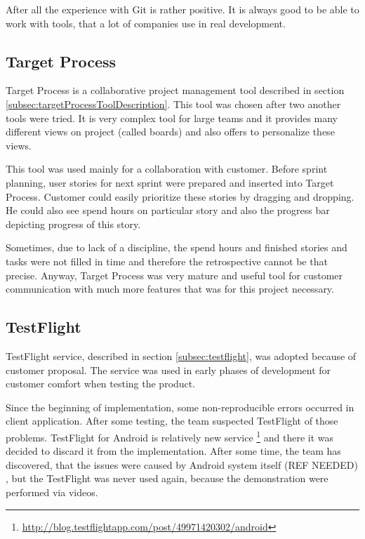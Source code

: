 After all the experience with Git is rather positive. 
It is always good to be able to work with tools, that a lot of companies use in real development.


\subsection{Target Process}
Target Process is a collaborative project management tool described in section \ref{subsec:targetProcessToolDescription}.
This tool was chosen after two another tools were tried.
It is very complex tool for large teams and it provides many different views on project (called boards) and also offers to personalize these views.

This tool was used mainly for a collaboration with customer. 
Before sprint planning, user stories for next sprint were prepared and inserted into Target Process.
Customer could easily prioritize these stories by dragging and dropping.
He could also see spend hours on particular story and also the progress bar depicting progress of this story.

Sometimes, due to lack of a discipline, the spend hours and finished stories and tasks were not filled in time and therefore the retrospective cannot be that precise.
Anyway, Target Process was very mature and useful tool for customer communication with much more features that was for this project necessary.


\subsection{TestFlight}
TestFlight service, described in section \ref{subsec:testflight}, was adopted because of customer proposal.
The service was used in early phases of development for customer comfort when testing the product.

Since the beginning of implementation, some non-reproducible errors occurred in client application.
After some testing, the team suspected TestFlight of those problems.
TestFlight for Android is relatively new service \footnote{\url{http://blog.testflightapp.com/post/49971420302/android}} and there it was decided to discard it from the implementation.
After some time, the team has discovered, that the issues were caused by Android system itself 
(REF NEEDED)
, but the TestFlight was never used again, because the demonstration were performed via videos.
 
